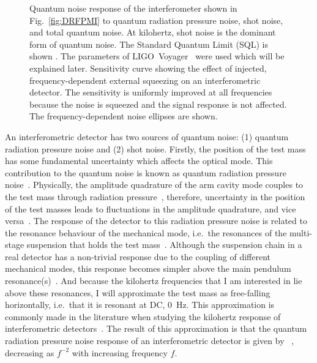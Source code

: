 \begin{figure}
	\centering
	\caption{Quantum noise response of the interferometer shown in Fig.~\ref{fig:DRFPMI} to quantum radiation pressure noise, shot noise, and total quantum noise. At kilohertz, shot noise is the dominant form of quantum noise. The Standard Quantum Limit (SQL) is shown . The parameters of LIGO~Voyager~\cite{} were used which will be explained later.   Sensitivity  curve showing the effect of injected, frequency-dependent external squeezing on an interferometric detector. The sensitivity is uniformly improved at all frequencies because the noise is squeezed and the signal response is not affected. The frequency-dependent noise ellipses are shown.} %
	\label{fig:simplifed_QN_response_conventional}
\end{figure}


An interferometric detector has two sources of quantum noise: (1) quantum radiation pressure noise and (2) shot noise. 
Firstly, the position of the test mass has some fundamental uncertainty which affects the optical mode. %
This contribution to the quantum noise is known as quantum radiation pressure noise~\cite{}. 
Physically, the amplitude quadrature of the arm cavity mode couples to the test mass through radiation pressure~\cite{}, therefore, uncertainty in the position of the test masses leads to fluctuations in the amplitude quadrature, and vice versa~\cite{danilishinQuantumMeasurementTheory2012?}. The response of the detector to this radiation pressure noise is related to the resonance behaviour of the mechanical mode, i.e.\ the resonances of the multi-stage suspension that holds the test mass~\cite{}. Although the suspension chain in a real detector has a non-trivial response due to the coupling of different mechanical modes, this response becomes simpler above the main pendulum resonance(s)~\cite{}. And because the kilohertz frequencies that I am interested in lie above these resonances, I will approximate the test mass as free-falling horizontally, i.e.\ that it is resonant at DC, $0$~Hz. This approximation is commonly made in the literature when studying the kilohertz response of interferometric detectors~\cite{}. The result of this approximation is that the quantum radiation pressure noise response of an interferometric detector is given by ~\cite{}, decreasing as $f^{-2}$ with increasing frequency $f$.

